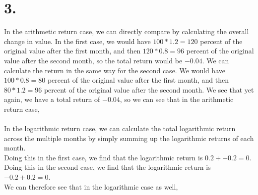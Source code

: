 \documentclass{article}
\begin{document}
\section*{3.}
{\Large 
In the arithmetic return case, we can directly compare by calculating the overall change in value. In the first case, we would have $100 * 1.2 = 120$ percent of the original value after the first month, and then $120 * 0.8 = 96$ percent of the original value after the second month, so the total return would be $-0.04$. We can calculate the return in the same way for the second case. We would have $100 * 0.8 = 80$ percent of the original value after the first month, and then $80 * 1.2 = 96$ percent of the original value after the second month. We see that yet again, we have a total return of $-0.04$, so we can see that in the arithmetic return case,  \\ \\
In the logarithmic return case, we can calculate the total logarithmic return across the multiple months by simply summing up the logarithmic returns of each month. \\
Doing this in the first case, we find that the logarithmic return is $0.2 + -0.2 = 0$. \\
Doing this in the second case, we find that the logarithmic return is $-0.2 + 0.2 = 0$. \\
We can therefore see that in the logarithmic case as well, 



}
\end{document}
